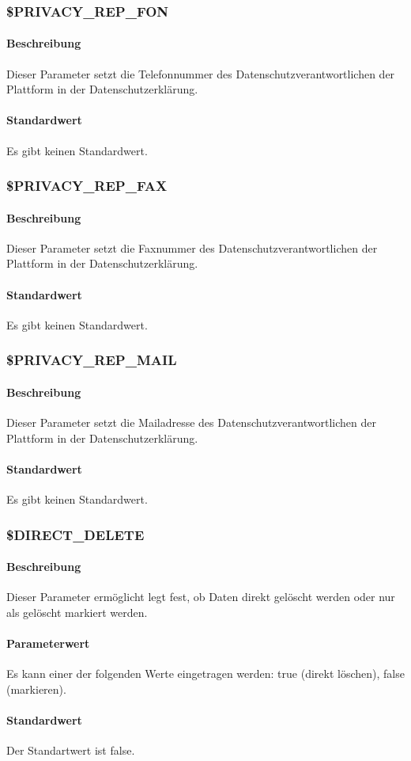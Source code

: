 \subsubsection{\$PRIVACY\_REP\_FON}\label{config:privacy-rep-fon}
\paragraph{Beschreibung}Dieser Parameter setzt die Telefonnummer des Datenschutzverantwortlichen der Plattform in der Datenschutzerklärung.
\paragraph{Standardwert}Es gibt keinen Standardwert.

\subsubsection{\$PRIVACY\_REP\_FAX}\label{config:privacy-rep-fax}
\paragraph{Beschreibung}Dieser Parameter setzt die Faxnummer des Datenschutzverantwortlichen der Plattform in der Datenschutzerklärung.
\paragraph{Standardwert}Es gibt keinen Standardwert.

\subsubsection{\$PRIVACY\_REP\_MAIL}\label{config:privacy-rep-mail}
\paragraph{Beschreibung}Dieser Parameter setzt die Mailadresse des Datenschutzverantwortlichen der Plattform in der Datenschutzerklärung.
\paragraph{Standardwert}Es gibt keinen Standardwert.

\subsubsection{\$DIRECT\_DELETE}
\paragraph{Beschreibung}Dieser Parameter ermöglicht legt fest, ob Daten direkt gelöscht werden oder nur als gelöscht markiert werden.
\paragraph{Parameterwert}Es kann einer der folgenden Werte eingetragen werden: {\glqq true\grqq} (direkt löschen), {\glqq false\grqq} (markieren).
\paragraph{Standardwert}Der Standartwert ist {\glqq false\grqq}.